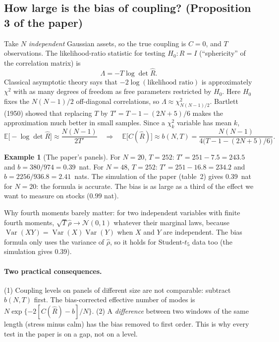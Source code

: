 \documentclass[11pt]{article}
\theoremstyle{plain}
\theoremstyle{definition}
\newtheorem{exemple}[proposition]{Example}
\theoremstyle{remark}
\newcommand{\E}{\mathbb{E}}
\newcommand{\N}{\mathcal{N}}
\newcommand{\BIASTWENTY}{0.39}
\newcommand{\BIASFORTYEIGHT}{2.41}
\newcommand{\BIASTWENTYMC}{0.39}
\newcommand{\BIASTWENTYT}{0.39}
\begin{document}
\subsection{How large is the bias of coupling? (Proposition 3 of the paper)}\label{sec:bias-note}

Take $N$ \emph{independent} Gaussian assets, so the true coupling is $C=0$,
and $T$ observations. The likelihood-ratio statistic for testing $H_0:R=I$
(``sphericity'' of the correlation matrix) is
\[
\Lambda=-T\log\det\hat R .
\]
Classical asymptotic theory says that $-2\log(\text{likelihood ratio})$ is
approximately $\chi^2$ with as many degrees of freedom as free parameters
restricted by $H_0$. Here $H_0$ fixes the $N(N-1)/2$ off-diagonal
correlations, so $\Lambda\approx\chi^2_{N(N-1)/2}$. Bartlett (1950) showed that
replacing $T$ by $T'=T-1-(2N+5)/6$ makes the approximation much better in
small samples. Since a $\chi^2_k$ variable has mean $k$,
\[
\E\bigl[-\log\det\hat R\bigr]\approx\frac{N(N-1)}{2T'}
\quad\Longrightarrow\quad
\E\bigl[C(\hat R)\bigr]\approx b(N,T)=\frac{N(N-1)}{4\bigl(T-1-(2N+5)/6\bigr)} .
\]

\begin{exemple}[The paper's panels]
For $N=20$, $T=252$: $T'=251-7.5=243.5$ and $b=380/974=\BIASTWENTY$~nat. For
$N=48$, $T=252$: $T'=251-16.8=234.2$ and $b=2256/936.8=\BIASFORTYEIGHT$~nats.
The simulation of the paper (table~2) gives \BIASTWENTYMC~nat for $N=20$: the
formula is accurate. The bias is as large as a third of the effect we want
to measure on stocks ($0.99$ nat).
\end{exemple}

\begin{intuition}
Why fourth moments barely matter: for two independent variables with finite
fourth moments, $\sqrt T\hat\rho\to\N(0,1)$ whatever their marginal laws,
because $\operatorname{Var}(XY)=\operatorname{Var}(X)\operatorname{Var}(Y)$
when $X$ and $Y$ are independent. The bias formula only uses the variance of
$\hat\rho$, so it holds for Student-$t_5$ data too (the simulation gives
\BIASTWENTYT).
\end{intuition}

\paragraph{Two practical consequences.} (1) Coupling levels on panels of
different size are not comparable: subtract $b(N,T)$ first. The
bias-corrected effective number of modes is $N\exp\{-2[C(\hat R)-b]/N\}$.
(2) A \emph{difference} between two windows of the same length (stress minus
calm) has the bias removed to first order. This is why every test in the
paper is on a gap, not on a level.
\end{document}
